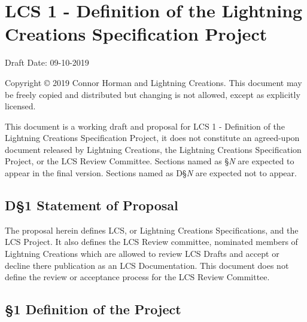 \documentclass[
]{article}
\date{}
\begin{document}
\hypertarget{lcs-1---definition-of-the-lightning-creations-specification-project}{%
\section{LCS 1 - Definition of the Lightning Creations Specification
Project}\label{lcs-1---definition-of-the-lightning-creations-specification-project}}

Draft Date: 09-10-2019

Copyright © 2019 Connor Horman and Lightning Creations. This document
may be freely copied and distributed but changing is not allowed, except
as explicitly licensed.

This document is a working draft and proposal for LCS 1 - Definition of
the Lightning Creations Specification Project, it does not constitute an
agreed-upon document released by Lightning Creations, the Lightning
Creations Specification Project, or the LCS Review Committee. Sections
named as §\emph{N} are expected to appear in the final version. Sections
named as D§\emph{N} are expected not to appear.

\hypertarget{d1-statement-of-proposal}{%
\subsection{D§1 Statement of Proposal}\label{d1-statement-of-proposal}}

The proposal herein defines LCS, or Lightning Creations Specifications,
and the LCS Project. It also defines the LCS Review committee, nominated
members of Lightning Creations which are allowed to review LCS Drafts
and accept or decline there publication as an LCS Documentation. This
document does not define the review or acceptance process for the LCS
Review Committee.

\hypertarget{definition-of-the-project}{%
\subsection{§1 Definition of the
Project}\label{definition-of-the-project}}
\end{document}
